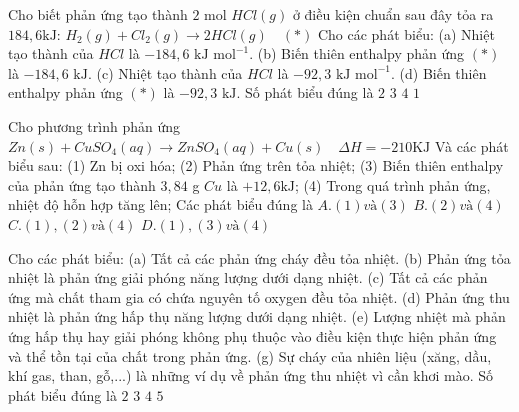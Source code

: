 \documentclass[Main.tex]{subfiles}
\begin{document}
	\begin{ex}
		[CD – SGK] Cho biết phản ứng tạo thành $2$ mol $HCl(g)$ ở điều kiện chuẩn sau đây tỏa ra $184{,}6 \text{kJ}$: $H_2(g) + Cl_2(g) \longrightarrow 2HCl(g) \quad (*)$
		Cho các phát biểu:
		(a) Nhiệt tạo thành của $HCl$ là $-184{,}6 \text{ kJ mol}^{-1}$.
		(b) Biến thiên enthalpy phản ứng $(*) $ là $-184{,}6 \text{ kJ}$.
		(c) Nhiệt tạo thành của $HCl$ là $-92{,}3 \text{ kJ mol}^{-1}$.
		(d) Biến thiên enthalpy phản ứng $(*) $ là $-92{,}3 \text{ kJ}$.
		Số phát biểu đúng là
		{\True $2$}
		{$3$}
		{$4$}
		{$1$}
	\end{ex}
	\begin{ex}
		 Cho phương trình phản ứng
		$Zn (s) + CuSO_4 (aq) \longrightarrow ZnSO_4 (aq) + Cu (s) \quad \Delta H = -210 \text{KJ}$
		Và các phát biểu sau:
		(1) Zn bị oxi hóa;
		(2) Phản ứng trên tỏa nhiệt;
		(3) Biến thiên enthalpy của phản ứng tạo thành $3{,}84$ g $Cu$ là $+12{,}6 \text{kJ}$;
		(4) Trong quá trình phản ứng, nhiệt độ hỗn hợp tăng lên;
		Các phát biểu đúng là
		{$A. (1) và (3)$}
		{$B. (2) và (4)$}
		{\True $C. (1), (2) và (4)$}
		{$D. (1), (3) và (4)$}
	\end{ex}
	\begin{ex}[CD – SBT] Cho các phát biểu:
		(a) Tất cả các phản ứng cháy đều tỏa nhiệt.
		(b) Phản ứng tỏa nhiệt là phản ứng giải phóng năng lượng dưới dạng nhiệt.
		(c) Tất cả các phản ứng mà chất tham gia có chứa nguyên tố oxygen đều tỏa nhiệt.
		(d) Phản ứng thu nhiệt là phản ứng hấp thụ năng lượng dưới dạng nhiệt.
		(e) Lượng nhiệt mà phản ứng hấp thụ hay giải phóng không phụ thuộc vào điều kiện thực hiện phản ứng và thể tồn tại của chất trong phản ứng.
		(g) Sự cháy của nhiên liệu (xăng, dầu, khí gas, than, gỗ,...) là những ví dụ về phản ứng thu nhiệt vì cần khơi mào.
		Số phát biểu đúng là
		{$2$}
		{\True $3$}
		{$4$}
		{$5$}
	\end{ex}
\end{document}

